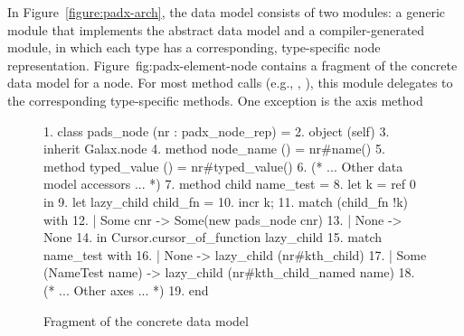 In Figure~\ref{figure:padx-arch}, the \pads{} data model consists of
two modules: a generic module that implements the \Galax{} abstract
data model and a compiler-generated module, in which each \pads{} type
has a corresponding, type-specific node representation.
Figure~{fig:padx-element-node} contains a fragment of the \padx{}
concrete data model for a node.  For most method calls (e.g.,
, ), this module delegates to the
corresponding type-specific methods.  One exception is the 
axis method
\begin{figure*}
\begin{small}
\begin{code}
{ 1}. class pads\_node (nr : padx\_node\_rep) =  
{ 2}. object (self)
{ 3}.   inherit Galax.node
{ 4}.   method node\_name   () = nr#name()
{ 5}.   method typed\_value () = nr#typed_value() 
{ 6}.   (* ... Other data model accessors ... *)
\mbox{}
{ 7}.   method child name\_test =  
{ 8}.     let k = ref 0 in
{ 9}.     let lazy\_child child\_fn = 
{10}.      incr k;
{11}.       match (child\_fn !k) with
{12}.       | Some cnr ->  Some(new pads\_node cnr)
{13}.       | None -> None
{14}.       in Cursor.cursor\_of\_function lazy\_child
{15}.     match name\_test with 
{16}.     | None ->  lazy\_child (nr#kth\_child)
{17}.     | Some (NameTest name) -> lazy\_child (nr#kth\_child\_named name)
\mbox{}
{18}.   (* ... Other axes ... *)
{19}. end
\end{code}
\end{small}
\caption{Fragment of the \padx{} concrete data model}
\label{fig:padx-element-node}
\end{figure*}



